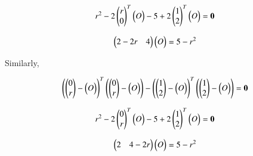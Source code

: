 \documentclass[journal,12pt,twocolumn]{IEEEtran}
\begin{document}
\begin{align}
r^2 - 2 \myvec{r \\ 0}^T\myvec{O} - 5 +2\myvec{1\\ 2\\}^T \myvec{O}  = \vec{0} \label{2.11}
\end{align}


\begin{align}
\myvec{2 -2r & 4 \\}\myvec{O} = 5-r^2 \label{2.12}
\end{align}


Similarly,

\begin{align}
\myvec{\myvec{0 \\ r \\} - \myvec{O}}^T \myvec{\myvec{0 \\ r \\} - \myvec{ O}} - \myvec{\myvec{1 \\ 2 \\} - \myvec{O}}^T\myvec{\myvec{1 \\ 2 \\} - \myvec{O}} = \vec{0} \label{2.13}
\end{align}



\begin{align}
r^2 - 2 \myvec{0 \\ r}^T\myvec{O} - 5 +2\myvec{1\\ 2\\}^T \myvec{O}  = \vec{0} \label{2.14}
\end{align}


\begin{align}
\myvec{2  & 4 -2r \\}\myvec{O} = 5-r^2 \label{2.15}
\end{align}
\end{document}
